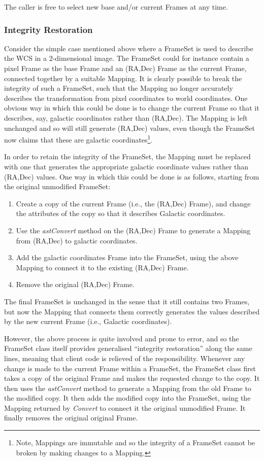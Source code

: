 \documentclass[final,authoryear,5p,times,twocolumn]{elsarticle}
\begin{document}
The caller is free to select new base and/or current Frames at any time.

\subsubsection{Integrity Restoration}
\label{sec:integrity}
Consider the simple case mentioned above where a FrameSet is used to
describe the WCS in a 2-dimensional image. The FrameSet could for
instance contain a pixel Frame as the base Frame and an (RA,Dec) Frame as
the current Frame, connected together by a suitable Mapping. It is
clearly possible to break the integrity of such a FrameSet, such that the
Mapping no longer accurately describes the transformation from pixel
coordinates to world coordinates. One obvious way in which this could be
done is to change the current Frame so that it describes, say, galactic
coordinates rather than (RA,Dec). The Mapping is left unchanged and so will
still generate (RA,Dec) values, even though the FrameSet now claims that
these are galactic coordinates\footnote{Note, Mappings are immutable and so the
integrity of a FrameSet cannot be broken by making changes to a Mapping.}.

In order to retain the integrity of the FrameSet, the Mapping must
be replaced with one that generates the appropriate galactic coordinate
values rather than (RA,Dec) values. One way in which this could be done is as
follows, starting from the original unmodified FrameSet:

\begin{enumerate}
\item Create a copy of the current Frame (i.e., the (RA,Dec) Frame), and
change the attributes of the copy so that it describes Galactic
coordinates.
\item Use the \emph{astConvert} method on the (RA,Dec) Frame to generate a
Mapping from (RA,Dec) to galactic coordinates.
\item Add the galactic coordinates Frame into the FrameSet, using the
above Mapping to connect it to the existing (RA,Dec) Frame.
\item Remove the original (RA,Dec) Frame.
\end{enumerate}

The final FrameSet is unchanged in the sense that it still contains two
Frames, but now the Mapping that connects them correctly generates the values
described by the new current Frame (i.e., Galactic coordinates).

However, the above process is quite involved and prone to error, and so
the FrameSet class itself provides generalised ``integrity restoration''
along the same lines, meaning that client code is relieved of the
responsibility. Whenever any change is made to the current Frame within a
FrameSet, the FrameSet class first takes a copy of the original Frame and
makes the requested change to the copy. It then uses the \emph{astConvert}
method to generate a Mapping from the old Frame to the modified copy. It
then adds the modified copy into the FrameSet, using the Mapping returned
by \emph{Convert} to connect it the original unmodified Frame. It finally
removes the original original Frame.
\end{document}
